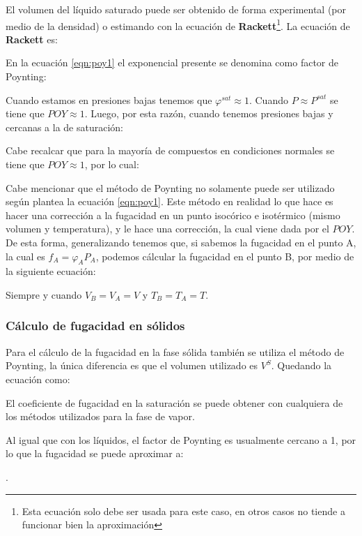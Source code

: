 El volumen del líquido saturado puede ser obtenido de forma experimental (por medio de la densidad) o estimando con la ecuación de \textbf{Rackett}\footnote{Esta ecuación solo debe ser usada para este caso, en otros casos no tiende a funcionar bien la aproximación}. La ecuación de \textbf{Rackett} es:


En la ecuación \ref{eqn:poy1} el exponencial presente se denomina como factor de Poynting:


Cuando estamos en presiones bajas tenemos que $\varphi^{sat}\approx 1$. Cuando $P\approx P^{sat}$ se tiene que $POY\approx 1$.
Luego, por esta razón, cuando tenemos presiones bajas y cercanas a la de saturación:


Cabe recalcar que para la mayoría de compuestos en condiciones normales se tiene que $POY\approx 1$, por lo cual:


Cabe mencionar que el método de Poynting no solamente puede ser utilizado según plantea la ecuación \ref{eqn:poy1}. Este método en realidad lo que hace es hacer una corrección a la fugacidad en un punto isocórico e isotérmico (mismo volumen y temperatura), y le hace una corrección, la cual viene dada por el $POY$. De esta forma,
generalizando tenemos que, si sabemos la fugacidad en el punto A, la cual es $f_A=\varphi_A P_A$, podemos cálcular la fugacidad en el punto B, por medio de la siguiente ecuación:


Siempre y cuando $V_B=V_A=V$ y $T_B=T_A=T$.
\subsubsection{Cálculo de fugacidad en sólidos}

Para el cálculo de la fugacidad en la fase sólida también se utiliza el método de Poynting, la única diferencia es que el volumen utilizado es $V^{S}$. Quedando la ecuación como:


El coeficiente de fugacidad en la saturación se puede obtener con cualquiera de los métodos utilizados para la fase de vapor.

Al igual que con los líquidos, el factor de Poynting es usualmente cercano a 1, por lo que la fugacidad se puede aproximar a:

.